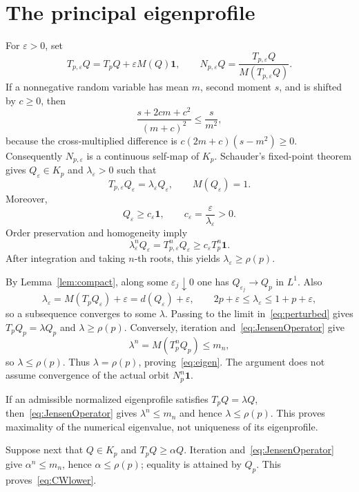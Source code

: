 \documentclass[a4paper,11pt]{amsart}
\theoremstyle{remark}
\begin{document}
\section{The principal eigenprofile}

For $\varepsilon>0$, set
\[
 T_{p,\varepsilon}Q=T_pQ+\varepsilon M(Q)\mathbf1,
 \qquad
 N_{p,\varepsilon}Q=\frac{T_{p,\varepsilon}Q}{M(T_{p,\varepsilon}Q)}.
\]
If a nonnegative random variable has mean $m$, second moment $s$, and is shifted by $c\ge0$, then
\begin{equation}\label{eq:shift}
 \frac{s+2cm+c^2}{(m+c)^2}\le\frac{s}{m^2},
\end{equation}
because the cross-multiplied difference is $c(2m+c)(s-m^2)\ge0$. Consequently $N_{p,\varepsilon}$ is a continuous self-map of $K_p$. Schauder's fixed-point theorem gives $Q_\varepsilon\in K_p$ and $\lambda_\varepsilon>0$ such that
\begin{equation}\label{eq:perturbed}
 T_{p,\varepsilon}Q_\varepsilon=\lambda_\varepsilon Q_\varepsilon,
 \qquad M(Q_\varepsilon)=1.
\end{equation}
Moreover,
\[
 Q_\varepsilon\ge c_\varepsilon\mathbf1,
 \qquad c_\varepsilon=\frac{\varepsilon}{\lambda_\varepsilon}>0.
\]
Order preservation and homogeneity imply
\[
 \lambda_\varepsilon^nQ_\varepsilon
 =T_{p,\varepsilon}^nQ_\varepsilon
 \ge c_\varepsilon T_p^n\mathbf1.
\]
After integration and taking $n$-th roots, this yields $\lambda_\varepsilon\ge\rho(p)$.

By Lemma~\ref{lem:compact}, along some $\varepsilon_j\downarrow0$ one has $Q_{\varepsilon_j}\to Q_p$ in $L^1$. Also
\[
 \lambda_\varepsilon=M(T_pQ_\varepsilon)+\varepsilon=d(Q_\varepsilon)+\varepsilon,
 \qquad 2p+\varepsilon\le\lambda_\varepsilon\le1+p+\varepsilon,
\]
so a subsequence converges to some $\lambda$. Passing to the limit in~\eqref{eq:perturbed} gives $T_pQ_p=\lambda Q_p$ and $\lambda\ge\rho(p)$. Conversely, iteration and~\eqref{eq:JensenOperator} give
\[
 \lambda^n=M(T_p^nQ_p)\le m_n,
\]
so $\lambda\le\rho(p)$. Thus $\lambda=\rho(p)$, proving~\eqref{eq:eigen}. The argument does not assume convergence of the actual orbit $N_p^n\mathbf1$.

If an admissible normalized eigenprofile satisfies $T_pQ=\lambda Q$, then~\eqref{eq:JensenOperator} gives $\lambda^n\le m_n$ and hence $\lambda\le\rho(p)$. This proves maximality of the numerical eigenvalue, not uniqueness of its eigenprofile.

Suppose next that $Q\in K_p$ and $T_pQ\ge\alpha Q$. Iteration and~\eqref{eq:JensenOperator} give $\alpha^n\le m_n$, hence $\alpha\le\rho(p)$; equality is attained by $Q_p$. This proves~\eqref{eq:CWlower}.
\end{document}
